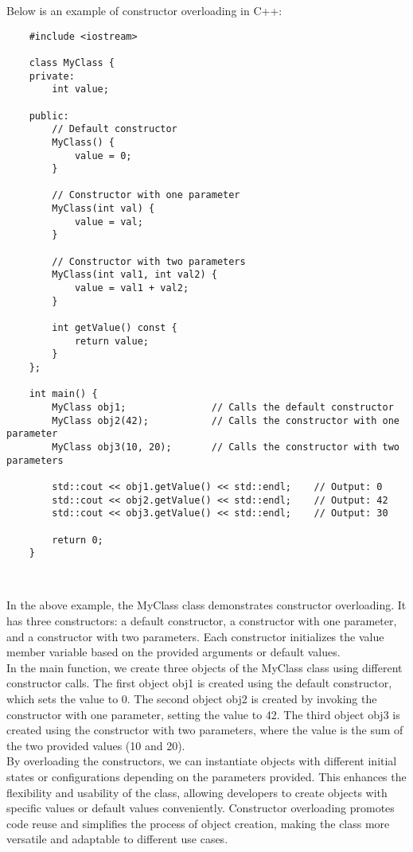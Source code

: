 \begin{solution}
    Below is an example of constructor overloading in C++: \\
    \horizontalline
    \begin{verbatim}
    #include <iostream>
    
    class MyClass {
    private:
        int value;
    
    public:
        // Default constructor
        MyClass() {
            value = 0;
        }
    
        // Constructor with one parameter
        MyClass(int val) {
            value = val;
        }
    
        // Constructor with two parameters
        MyClass(int val1, int val2) {
            value = val1 + val2;
        }
    
        int getValue() const {
            return value;
        }
    };
    
    int main() {
        MyClass obj1;               // Calls the default constructor
        MyClass obj2(42);           // Calls the constructor with one parameter
        MyClass obj3(10, 20);       // Calls the constructor with two parameters
    
        std::cout << obj1.getValue() << std::endl;    // Output: 0
        std::cout << obj2.getValue() << std::endl;    // Output: 42
        std::cout << obj3.getValue() << std::endl;    // Output: 30
    
        return 0;
    }
    \end{verbatim} \\
    \horizontalline

    In the above example, the MyClass class demonstrates constructor overloading. It has three constructors: a default constructor, a constructor with one parameter, and a constructor with two parameters. Each constructor initializes the value member variable based on the provided arguments 
    or default values. \\

    \noindent In the main function, we create three objects of the MyClass class using different constructor calls. The first object obj1 is created using the default constructor, which sets the value to 0. The second object obj2 is created by invoking the constructor with one parameter, 
    setting the value to 42. The third object obj3 is created using the constructor with two parameters, where the value is the sum of the two provided values (10 and 20). \\

    \noindent By overloading the constructors, we can instantiate objects with different initial states or configurations depending on the parameters provided. This enhances the flexibility and usability of the class, allowing developers to create objects with specific values or default values 
    conveniently. Constructor overloading promotes code reuse and simplifies the process of object creation, making the class more versatile and adaptable to different use cases. \\
\end{solution}

